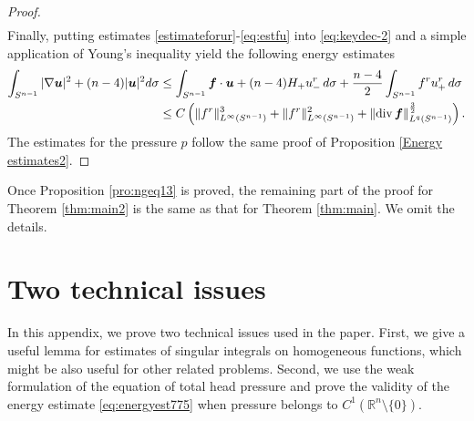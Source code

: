 \documentclass[12pt]{amsart}
\newtheorem{lemma}[theorem]{Lemma}
\renewcommand{\div}{{\rm div \thinspace }}
\newcommand{\Bu}{{\boldsymbol{u}}}
\newcommand{\Bf}{{\boldsymbol{f}}}
\begin{document}
\begin{proof}
\begin{equation}
\begin{aligned}
		\end{aligned}
	\end{equation}
	Finally, putting  estimates \eqref{estimateforur}-\eqref{eq:estfu} into \eqref{eq:keydec-2} and a simple application of Young's inequality yield the following energy estimates
	\begin{equation}
		\begin{aligned}
			\int_{S^{n-1}} |\nabla \Bu|^2 +(n-4)|\Bu|^2 d\sigma
			& \leq 	\int_{S^{n-1}} \Bf\cdot \Bu + (n-4)H_{+} u^r_{-}\,  d\sigma + \frac{n-4}{2} \int_{S^{n-1}} f^r u^r_{+}\, d\sigma \\
			& \leq  C\left( \|f^r\|_{L^{\infty}(S^{n-1})}^3 + \|f^r\|_{L^{\infty}(S^{n-1})}^2+ 
			\|\div \Bf\|_{L^q(S^{n-1})}^{\frac32} \right) .
		\end{aligned}
	\end{equation}
	The estimates for the pressure $p$ follow the same proof of Proposition \ref{Energy estimates2}.
\end{proof}

Once Proposition
\ref{pro:ngeq13} is proved, the remaining part of the proof for Theorem \ref{thm:main2} is the same as that for Theorem \ref{thm:main}. We omit the details. 

	
	
	
	\appendix
	\section{Two technical issues}\label{app:singularinteg}
	In this appendix, we prove two technical issues used in the paper. First, we give a  useful lemma for estimates of singular integrals on homogeneous functions, which might be also useful for other related problems. 
	Second, we use the weak formulation of the equation of total head pressure and prove the validity of the energy estimate \eqref{eq:energyest775} when pressure belongs to $C^1(\mathbb{R}^n\setminus\{0\})$.
	
\end{document}

